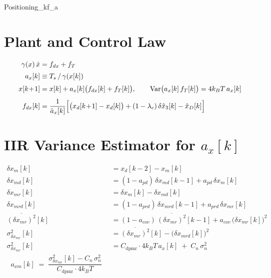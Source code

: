 \documentclass[11pt]{article}
\newcommand{\lc}{\lambda_c}
\newcommand{\Ts}{T_s}
\newcommand{\kB}{k_B}
\begin{document}
\noindent Positioning\_kf\_a
\vspace{0.5em}

\section{Plant and Control Law}

\begin{align}
\gamma(x)\,\dot{x} &= f_{dx} + f_T \\[2pt]
a_x[k] &\equiv \Ts \,/\, \gamma(x[k]) \\[2pt]
x[k\!+\!1] &= x[k] + a_x[k]\bigl(f_{dx}[k] + f_T[k]\bigr),
  \qquad \mathrm{Var}\bigl(a_x[k]\,f_T[k]\bigr) = 4\kB T\,a_x[k] \\[4pt]
f_{dx}[k] &= \frac{1}{\hat{a}_x[k]}\Bigl[\bigl(x_d[k\!+\!1] - x_d[k]\bigr)
  + (1-\lc)\,\delta\hat{x}_3[k] - \hat{x}_D[k]\Bigr]
\end{align}

\section{IIR Variance Estimator for $a_x[k]$}

\begin{align}
\delta x_m[k] &= x_d[k\!-\!2] - x_m[k] \\[2pt]
\delta x_{md}[k] &= (1-a_{pd})\,\delta x_{md}[k\!-\!1] + a_{pd}\,\delta x_m[k] \\[2pt]
\delta x_{mr}[k] &= \delta x_m[k] - \delta x_{md}[k] \\[2pt]
\delta x_{mrd}[k] &= (1-a_{prd})\,\delta x_{mrd}[k\!-\!1] + a_{prd}\,\delta x_{mr}[k] \\[2pt]
\overline{(\delta x_{mr})^{2}}[k] &= (1-a_{cov})\,\overline{(\delta x_{mr})^{2}}[k\!-\!1]
  + a_{cov}\,\bigl(\delta x_{mr}[k]\bigr)^{2} \\[2pt]
\sigma^{2}_{\delta x_{mr}}[k] &= \overline{(\delta x_{mr})^{2}}[k]
  - \bigl(\delta x_{mrd}[k]\bigr)^{2} \\[4pt]
\sigma^{2}_{\delta x_{mr}}[k] &= C_{\mathrm{dpmr}}\cdot 4\kB T\,a_x[k]
  \;+\; C_{n}\,\sigma^{2}_n \\[4pt]
\boxed{\;\;
a_{xm}[k] \;=\; \dfrac{\sigma^{2}_{\delta x_{mr}}[k] - C_{n}\,\sigma^{2}_n}
                    {C_{\mathrm{dpmr}}\cdot 4\kB T}
\;\;}
\end{align}
\end{document}
